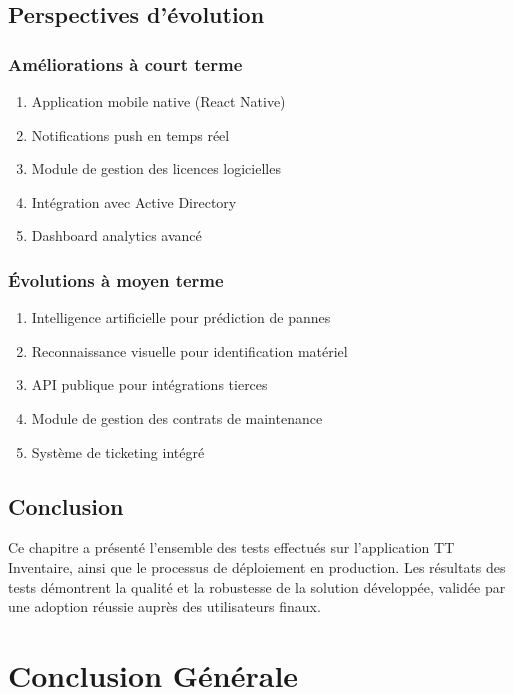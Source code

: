 \section{Perspectives d'évolution}

\subsection{Améliorations à court terme}

\begin{enumerate}
    \item Application mobile native (React Native)
    \item Notifications push en temps réel
    \item Module de gestion des licences logicielles
    \item Intégration avec Active Directory
    \item Dashboard analytics avancé
\end{enumerate}

\subsection{Évolutions à moyen terme}

\begin{enumerate}
    \item Intelligence artificielle pour prédiction de pannes
    \item Reconnaissance visuelle pour identification matériel
    \item API publique pour intégrations tierces
    \item Module de gestion des contrats de maintenance
    \item Système de ticketing intégré
\end{enumerate}

\section{Conclusion}

Ce chapitre a présenté l'ensemble des tests effectués sur l'application TT Inventaire, ainsi que le processus de déploiement en production. Les résultats des tests démontrent la qualité et la robustesse de la solution développée, validée par une adoption réussie auprès des utilisateurs finaux.

\chapter*{Conclusion Générale}

